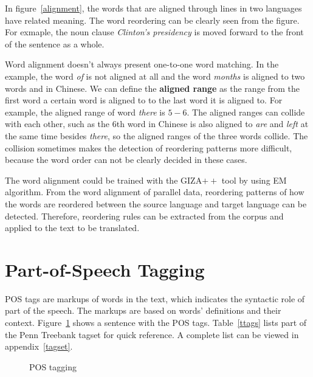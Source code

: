In figure~\ref{alignment}, the words that are aligned through lines in two languages have related meaning. The word reordering can be clearly seen from the figure. For exmaple, the noun clause \emph{Clinton's presidency} is moved forward to the front of the sentence as a whole.

\label{alignedrange}
Word alignment doesn't always present one-to-one word matching. In the example, the word \emph{of} is not aligned at all and the word \emph{months} is aligned to two words  and  in Chinese. We can define the \textbf{aligned range} as the range from the first word a certain word is aligned to to the last word it is aligned to. For example, the aligned range of word \emph{there} is $5-6$. The aligned ranges can collide with each other, such as the $6$th word  in Chinese is also aligned to \emph{are} and \emph{left} at the same time besides \emph{there}, so the aligned ranges of the three words collide. The collision sometimes makes the detection of reordering patterns more difficult, because the word order can not be clearly decided in these cases.

The word alignment could be trained with the GIZA$++$ tool by using \ac{EM} algorithm. From the word alignment of parallel data, reordering patterns of how the words are reordered between the source language and target language can be detected. Therefore, reordering rules can be extracted from the corpus and applied to the text to be translated.

\section{Part-of-Speech Tagging}

\acf{POS} tags are markups of words in the text, which indicates the syntactic role of part of the speech. The markups are based on words' definitions and their context. Figure~\ref{tags} shows a sentence with the POS tags. Table~\ref{ttags} lists part of the Penn Treebank tagset for quick reference. A complete list can be viewed in appendix~\ref{tagset}.

\begin{figure}[H]

\centering

\caption{POS tagging}
\label{tags}
\end{figure}

